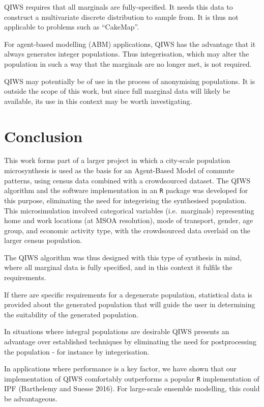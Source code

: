 \documentclass{JASSS}
\begin{document}
QIWS requires that all marginals are fully-specified. It needs this data
to construct a multivariate discrete distribution to sample from. It is
thus not applicable to problems such as ``CakeMap''.

For agent-based modelling (ABM) applications, QIWS has the advantage
that it always generates integer populations. Thus integerisation, which
may alter the population in such a way that the marginals are no longer
met, is not required.

QIWS may potentially be of use in the process of anonymising
populations. It is outside the scope of this work, but since full
marginal data will likely be available, its use in this context may be
worth investigating.

\section{Conclusion}\label{conclusion}

This work forms part of a larger project in which a city-scale
population microsynthesis is used as the basis for an Agent-Based Model
of commute patterns, using census data combined with a crowdsourced
dataset. The QIWS algorithm and the software implementation in an
\texttt{R} package was developed for this purpose, eliminating the need
for integerising the synthesised population. This microsimulation
involved categorical variables (i.e.~marginals) representing home and
work locations (at MSOA resolution), mode of transport, gender, age
group, and economic activity type, with the crowdsourced data overlaid
on the larger census population.

The QIWS algorithm was thus designed with this type of synthesis in
mind, where all marginal data is fully specified, and in this context it
fulfils the requirements.

If there are specific requirements for a degenerate population,
statistical data is provided about the generated population that will
guide the user in determining the suitability of the generated
population.

In situations where integral populations are desirable QIWS presents an
advantage over established techniques by eliminating the need for
postprocessing the population - for instance by integerisation.

In applications where performance is a key factor, we have shown that
our implementation of QIWS comfortably outperforms a popular \texttt{R}
implementation of IPF (Barthelemy and Suesse 2016). For large-scale
ensemble modelling, this could be advantageous.
\end{document}
